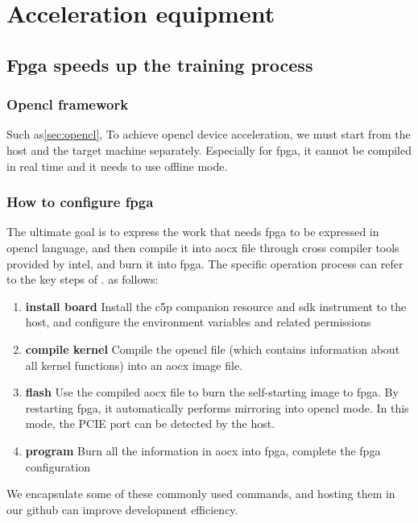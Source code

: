 \section{Acceleration equipment}
\subsection{Fpga speeds up the training process}
\subsubsection{Opencl framework}\label{sec:opencl-step}
Such as\ref{sec:opencl}, To achieve opencl device acceleration, we must start from the host and the target machine separately. Especially for fpga, it cannot be compiled in real time and it needs to use offline mode.
\subsubsection{How to configure fpga}
The ultimate goal is to express the work that needs fpga to be expressed in opencl language, and then compile it into aocx file through cross compiler tools provided by intel, and burn it into fpga. The specific operation process can refer to the key steps of \cite{intel-opencl}. as follows:
\begin{enumerate}
  \item{\textbf{install board}} Install the c5p companion resource and sdk instrument to the host, and configure the environment variables and related permissions
  \item{\textbf{compile kernel}} Compile the opencl file (which contains information about all kernel functions) into an aocx image file.
  \item{\textbf{flash}} Use the compiled aocx file to burn the self-starting image to fpga. By restarting fpga, it automatically performs mirroring into opencl mode. In this mode, the PCIE port can be detected by the host.
  \item{\textbf{program}} Burn all the information in aocx into fpga, complete the fpga configuration
\end{enumerate}

We encapsulate some of these commonly used commands, and hosting them in our github\cite{rcClub} can improve development efficiency.

